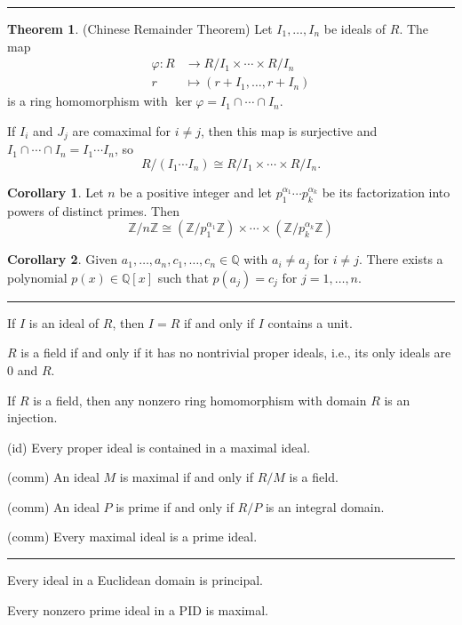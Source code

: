 \documentclass[12pt]{article}
\newcommand{\sepline}{\rule{\textwidth}{0.4pt}}
\theoremstyle{definition}
\newtheorem{theorem}{Theorem}
\newtheorem{corollary}{Corollary}
\newcommand{\Z}{\mathbb{Z}}
\newcommand{\Q}{\mathbb{Q}}
\renewcommand{\phi}{\varphi}
\newcommand{\<}{\left\langle}
\renewcommand{\>}{\right\rangle}
\newcommand{\isom}{\cong}
\begin{document}
\sepline

\begin{theorem}(Chinese Remainder Theorem)
    Let $I_1, \dots, I_n$ be ideals of $R$. The map
    \begin{align*}
        \phi : R &\to R/I_1 \times \cdots \times R/I_n \\
            r &\mapsto (r+I_1, \dots, r+I_n)
    \end{align*}
    is a ring homomorphism with $\ker \phi = I_1 \cap \cdots \cap I_n$.
    
    If $I_i$ and $J_j$ are comaximal for $i \ne j$, then this map is surjective and $I_1 \cap \cdots \cap I_n = I_1 \cdots I_n$, so
    \[
        R/(I_1 \cdots I_n) \isom R/I_1 \times \cdots \times R/I_n.
    \]
\end{theorem}

\begin{corollary}
    Let $n$ be a positive integer and let $p_1^{\alpha_1} \cdots p_k^{\alpha_k}$ be its factorization into powers of distinct primes. Then
    \[
        \Z/n\Z \isom (\Z/p_1^{\alpha_1}\Z) \times \cdots \times (\Z/p_k^{\alpha_k}\Z)
    \]
\end{corollary}

\begin{corollary}
    Given $a_1, \dots, a_n, c_1, \dots, c_n \in \Q$ with $a_i \ne a_j$ for $i \ne j$. There exists a polynomial $p(x) \in \Q[x]$ such that $p(a_j) = c_j$ for $j = 1, \dots, n$.
\end{corollary}

\sepline

If $I$ is an ideal of $R$, then $I = R$ if and only if $I$ contains a unit.

$R$ is a field if and only if it has no nontrivial proper ideals, i.e., its only ideals are $0$ and $R$.

If $R$ is a field, then any nonzero ring homomorphism with domain $R$ is an injection.

(id) Every proper ideal is contained in a maximal ideal.

(comm) An ideal $M$ is maximal if and only if $R/M$ is a field.

(comm) An ideal $P$ is prime if and only if $R/P$ is an integral domain.

(comm) Every maximal ideal is a prime ideal.

\sepline

Every ideal in a Euclidean domain is principal.

Every nonzero prime ideal in a PID is maximal.
\end{document}
